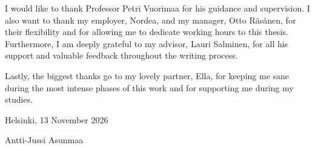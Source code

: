 I would like to thank Professor Petri Vuorimaa for his guidance and supervision. I also want to thank my employer, Nordea, and my manager, Otto Räsänen, for their flexibility and for allowing me to dedicate working hours to this thesis. Furthermore, I am deeply grateful to my advisor, Lauri Salminen, for all his support and valuable feedback throughout the writing process.

Lastly, the biggest thanks go to my lovely partner, Ella, for keeping me sane during the most intense phases of this work and for supporting me during my studies.

\vspace{5cm}
Helsinki, 13 November 2026

\vspace{5mm}
{\hfill Antti-Jussi Asunmaa \hspace{1cm}}

\newpage